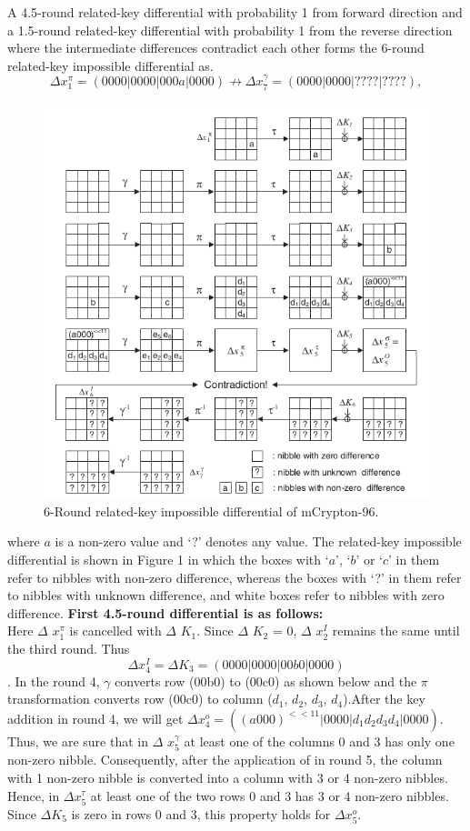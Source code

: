 \documentclass{transcrypto}
\begin{document}
	A 4.5-round related-key differential with probability 1 from forward direction and a 1.5-round related-key differential with probability 1 from the reverse direction where the intermediate differences contradict each other forms the 6-round related-key impossible differential as.
	$$\Delta x_1^{\pi} = (0000|0000|000a|0000) \nrightarrow \Delta x_7^{\gamma} = (0000|0000|????|????),$$
	\begin{figure}
		\includegraphics[width=1\linewidth]{1.png}
		\caption{6-Round related-key impossible differential of mCrypton-96.}
	\end{figure}
	where $a$ is a non-zero value and ‘?’ denotes any value. The related-key impossible differential is
	shown in Figure 1 in which the boxes with ‘$a$’, ‘$b$’ or ‘$c$’ in them refer to nibbles with non-zero
	difference, whereas the boxes with ‘?’ in them refer to nibbles with unknown difference, and white
	boxes refer to nibbles with zero difference.
	\textbf{First 4.5-round differential is as follows:}\\
	Here $\Delta$ $x_1^{\pi}$ is cancelled with $\Delta$ $K_1$. Since $\Delta$ $K_2$ = 0, $\Delta$ $x_2^I$ remains the same until the third round. 
	Thus $$\Delta x_4^I = \Delta K_3=(0000|0000|00b0|0000)$$.
	In the round 4, $\gamma$ converts row (00b0) to (00c0) as shown below and the $\pi$ transformation converts row (00c0) to column ($d_1$, $d_2$, $d_3$, $d_4$).After the key addition in round 4, we will get $\Delta x_4^o = ((a000)^{<<11}|0000|d_1 d_2 d_3 d_4|0000)$. Thus, we are sure that in $\Delta$ $x_5^{\gamma}$ at least one of the columns 0 and 3 has only one non-zero nibble. Consequently, after the application of in round 5, the column with 1 non-zero nibble is converted into a column with 3 or 4 non-zero nibbles. Hence, in $\Delta x_5^{\tau}$ at least one of the two rows 0 and 3 has 3 or 4 non-zero nibbles. Since $\Delta K_5$ is zero in rows 0 and 3, this property holds for $\Delta x_5^o$.
	
\end{document}
